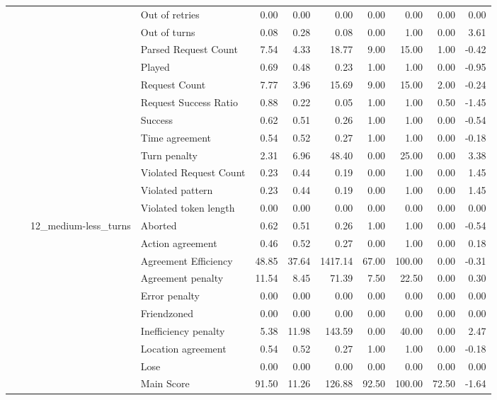 \begin{tabular}{llllrrrrrrr}
 &  &  & Out of retries & 0.00 & 0.00 & 0.00 & 0.00 & 0.00 & 0.00 & 0.00 \\
 &  &  & Out of turns & 0.08 & 0.28 & 0.08 & 0.00 & 1.00 & 0.00 & 3.61 \\
 &  &  & Parsed Request Count & 7.54 & 4.33 & 18.77 & 9.00 & 15.00 & 1.00 & -0.42 \\
 &  &  & Played & 0.69 & 0.48 & 0.23 & 1.00 & 1.00 & 0.00 & -0.95 \\
 &  &  & Request Count & 7.77 & 3.96 & 15.69 & 9.00 & 15.00 & 2.00 & -0.24 \\
 &  &  & Request Success Ratio & 0.88 & 0.22 & 0.05 & 1.00 & 1.00 & 0.50 & -1.45 \\
 &  &  & Success & 0.62 & 0.51 & 0.26 & 1.00 & 1.00 & 0.00 & -0.54 \\
 &  &  & Time agreement & 0.54 & 0.52 & 0.27 & 1.00 & 1.00 & 0.00 & -0.18 \\
 &  &  & Turn penalty & 2.31 & 6.96 & 48.40 & 0.00 & 25.00 & 0.00 & 3.38 \\
 &  &  & Violated Request Count & 0.23 & 0.44 & 0.19 & 0.00 & 1.00 & 0.00 & 1.45 \\
 &  &  & Violated pattern & 0.23 & 0.44 & 0.19 & 0.00 & 1.00 & 0.00 & 1.45 \\
 &  &  & Violated token length & 0.00 & 0.00 & 0.00 & 0.00 & 0.00 & 0.00 & 0.00 \\
\cline{3-11}
 &  & \multirow[t]{27}{*}{12_medium-less_turns} & Aborted & 0.62 & 0.51 & 0.26 & 1.00 & 1.00 & 0.00 & -0.54 \\
 &  &  & Action agreement & 0.46 & 0.52 & 0.27 & 0.00 & 1.00 & 0.00 & 0.18 \\
 &  &  & Agreement Efficiency & 48.85 & 37.64 & 1417.14 & 67.00 & 100.00 & 0.00 & -0.31 \\
 &  &  & Agreement penalty & 11.54 & 8.45 & 71.39 & 7.50 & 22.50 & 0.00 & 0.30 \\
 &  &  & Error penalty & 0.00 & 0.00 & 0.00 & 0.00 & 0.00 & 0.00 & 0.00 \\
 &  &  & Friendzoned & 0.00 & 0.00 & 0.00 & 0.00 & 0.00 & 0.00 & 0.00 \\
 &  &  & Inefficiency penalty & 5.38 & 11.98 & 143.59 & 0.00 & 40.00 & 0.00 & 2.47 \\
 &  &  & Location agreement & 0.54 & 0.52 & 0.27 & 1.00 & 1.00 & 0.00 & -0.18 \\
 &  &  & Lose & 0.00 & 0.00 & 0.00 & 0.00 & 0.00 & 0.00 & 0.00 \\
 &  &  & Main Score & 91.50 & 11.26 & 126.88 & 92.50 & 100.00 & 72.50 & -1.64 \\

\end{tabular}
